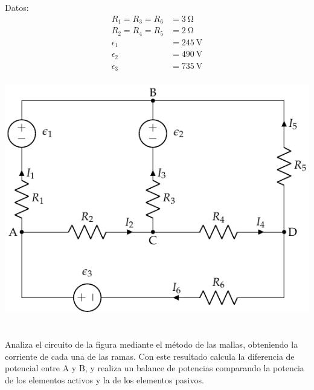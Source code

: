 \documentclass[12pt]{article}
\begin{document}
\begin{minipage}{0.4\linewidth}
  Datos:
  \begin{align*}
    R_1 = R_3 = R_6 &= \SI{3}{\ohm}\\
    R_2 = R_4 = R_5 &= \SI{2}{\ohm}\\
    \epsilon_1 &= \SI{245}{\volt}\\
    \epsilon_2 &= \SI{490}{\volt}\\
    \epsilon_3 &= \SI{735}{\volt}\\
  \end{align*}
\end{minipage}
\begin{minipage}{0.6\linewidth}
  \includegraphics{figs/mallas1.pdf}
\end{minipage}

\section{}
Analiza el circuito de la figura mediante el método de las mallas, obteniendo la corriente de cada una de las ramas. Con este resultado calcula la diferencia de potencial entre A y B, y realiza un balance de potencias comparando la potencia de los elementos activos y la de los elementos pasivos.
\end{document}
